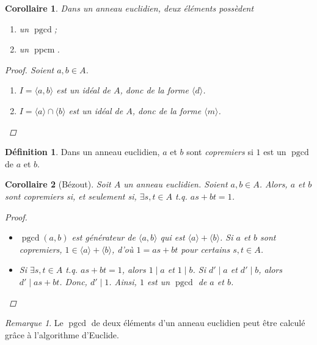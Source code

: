 \documentclass{report}
\newtheorem*{coro}{Corollaire}
\theoremstyle{definition}
\newtheorem*{dfn}{D\'efinition}
\theoremstyle{remark}
\newtheorem*{rmq}{Remarque}
\def\pgcd{\operatorname{pgcd}}
\def\ppcm{\operatorname{ppcm}}
\begin{document}
	\begin{coro}
		Dans un anneau euclidien, deux \'el\'ements poss\`edent
		\begin{enumerate}
			\item un $\pgcd$;
			\item un $\ppcm$.
		\end{enumerate}
		\begin{proof}
			Soient $a,b\in A$.
			\begin{enumerate}
				\item $I=\langle a,b \rangle$ est un id\'eal de $A$, donc de la forme $\langle d \rangle$.
				\item $I=\langle a \rangle \cap \langle b \rangle$ est un id\'eal de $A$, donc de la forme $\langle m \rangle$.
			\end{enumerate}
		\end{proof}
	\end{coro}

	\begin{dfn}
		Dans un anneau euclidien, $a$ et $b$ sont \emph{copremiers} si $1$ est un $\pgcd$ de $a$ et $b$.
	\end{dfn}

	\begin{coro}[B\'ezout]
		Soit $A$ un anneau euclidien. Soient $a,b\in A$. Alors, $a$ et $b$ sont copremiers si, et seulement si, $\exists s,t\in A$ t.q. $as+bt=1$.
		\begin{proof}
			\begin{itemize}
				\item[$\Rightarrow$:] $\pgcd(a,b)$ est g\'en\'erateur de $\langle a,b \rangle$ qui est $\langle a \rangle+\langle b \rangle$. Si $a$ et $b$ sont copremiers, $1\in\langle a \rangle+\langle b \rangle$, d'o\`u $1=as+bt$ pour certains $s,t\in A$.
				\item[$\Leftarrow$:] Si $\exists s,t\in A$ t.q. $as+bt=1$, alors $1 \mid a$ et $1 \mid b$. Si $d' \mid a$ et $d'\mid b$, alors $d' \mid as+bt$. Donc, $d' \mid 1$. Ainsi, $1$ est un $\pgcd$ de $a$ et $b$.
			\end{itemize}
		\end{proof}
	\end{coro}

	\begin{rmq}
		Le $\pgcd$ de deux \'el\'ements d'un anneau euclidien peut \^etre calcul\'e gr\^ace \`a l'algorithme d'Euclide.
	\end{rmq}
\end{document}
